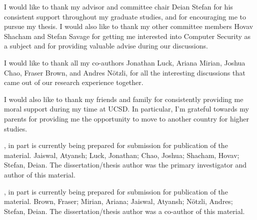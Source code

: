 \begin{frontmatter}
%
\tableofcontents
\listoffigures  %
\listoftables   %



%
%
\begin{acknowledgements}
  I would like to thank my advisor and committee chair Deian Stefan for his
  consistent support throughout my graduate studies, and for encouraging me to
  pursue my thesis. I would also like to thank my other committee members Hovav
  Shacham and Stefan Savage for getting me interested into Computer Security
  as a subject and for providing valuable advise during our discussions.

  I would like to thank all my co-authors Jonathan Luck, Ariana Mirian, Joshua
  Chao, Fraser Brown, and Andres N\"otzli, for all the interesting discussions
  that came out of our research experience together.

  I would also like to thank my friends and family for consistently providing
  me moral support during my time at UCSD. In particular, I'm grateful towards
  my parents for providing me the opportunity to move to another country for
  higher studies.

  , in part is currently being prepared for submission for
  publication of the material. Jaiswal, Atyansh; Luck, Jonathan; Chao, Joshua;
  Shacham, Hovav; Stefan, Deian. The dissertation/thesis author was the primary
  investigator and author of this material.

  , in part is currently being prepared for submission for
  publication of the material. Brown, Fraser; Mirian, Ariana; Jaiswal, Atyansh;
  N\"otzli, Andres; Stefan, Deian. The dissertation/thesis author was a
  co-author of this material.
\end{acknowledgements}



\end{frontmatter}
